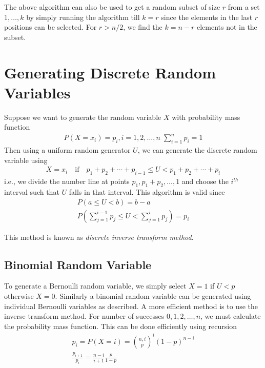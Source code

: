 \documentclass[../probability-notes.tex]{subfiles}
\begin{document}
    The above algorithm can also be used to get a random subset of size $r$ from a set $1, \dots, k$ by simply running the algorithm till $k = r$ since the elements in the last $r$ positions can be selected. For $r > n/2$, we find the $k=n-r$ elements not in the subset.


    \section{Generating Discrete Random Variables}
    Suppose we want to generate the random variable $X$ with probability mass function
    \begin{align*}
        P(X = x_{i}) = p_{i}, i = 1, 2, \ldots, n\; \sum_{i=1}^{n} p_{i} = 1 
    \end{align*}
    Then using a uniform random generator $U$, we can generate the discrete random variable using
    \begin{align*}
        X = x_{i} \quad \text{if} \quad p_{1} + p_{2} +\cdots + p_{i-1} \leq U < p_{1} + p_{2} +\cdots + p_{i} 
    \end{align*}
    i.e., we divide the number line at points $p_{1}, p_{1}+p_{2}, \ldots, 1$ and choose the $i^{th}$ interval such that $U$ falls in that interval. This algorithm is valid since
    \begin{gather*}
        P(a \leq U < b) = b-a\\
        P(\sum_{j=1}^{i-1}p_{j} \leq U < \sum_{j=1}^{i}p_{j}) = p_{i}
    \end{gather*}

    This method is known as \emph{discrete inverse transform method}.\newline


    \subsection{Binomial Random Variable}
    To generate a Bernoulli random variable, we simply select $X = 1$ if $U < p$ otherwise $X = 0$. Similarly a binomial random variable can be generated using individual Bernoulli variables as described. A more efficient method is to use the inverse transform method. For number of successes $0, 1, 2, \ldots, n$, we must calculate the probability mass function. This can be done efficiently using recursion
    \begin{gather*}
        p_{i} = P(X = i) = \binom{n, i} p^{i} (1-p)^{n-i}\\
        \frac{p_{i+1}}{p_{i}} = \frac{n-i}{i+1} \frac{p}{1-p}
    \end{gather*}
\end{document}
